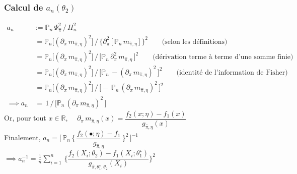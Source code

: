 \documentclass{article}
\begin{document}
            \subsubsection*{Calcul de $a_n(\theta_2)$}
                \begin{align*}
                    a_n & :=   \mathbb{P}_n\,\Psi_{\hat\pi}^2 \,\big/\, H_n^2 \\
                        & \,=  \mathbb{P}_n\Big[ (\partial_\pi\,{}m_{\hat\pi,\eta})^2 \Big] \,\big/\, \big\{ \partial^2_\pi\,\big[\,\mathbb{P}_n\,{}m_{\hat\pi,\eta}\,\big]\, \big\}^2 \qquad \mbox{(selon les définitions)} \\
                        & \,=  \mathbb{P}_n\Big[ (\partial_\pi\,{}m_{\hat\pi,\eta})^2 \Big] \,\big/\, \Big[ \mathbb{P}_n\, \partial^2_\pi\,{}m_{\hat\pi,\eta}\, \Big]^2 \qquad \mbox{(dérivation terme à terme d'une somme finie)} \\
                        & \,=  \mathbb{P}_n\Big[ (\partial_\pi\,{}m_{\hat\pi,\eta})^2 \Big] \,\big/\, \Big[ \mathbb{P}_n\, -(\partial_\pi\,{}m_{\hat\pi,\eta})^2\, \Big]^2 \qquad \mbox{(identité de l'information de Fisher)}\\
                        & \,=  \mathbb{P}_n\Big[ (\partial_\pi\,{}m_{\hat\pi,\eta})^2 \Big] \,\big/\, \Big[ -\,\mathbb{P}_n\, (\partial_\pi\,{}m_{\hat\pi,\eta})^2\, \Big]^2 \\
                \implies    a_n & \,= \,1 \,\big/\, \Big[ \mathbb{P}_n\, (\partial_\pi\,{}m_{\hat\pi,\eta})^2\, \Big]
                \end{align*}
                Or, pour tout $x\in\mathbb{R}$, $\quad \partial_\pi\,{}m_{\hat\pi,\eta}(x) = \dfrac{f_2(x;\eta)-f_1(x)}{g_{\hat\pi,\eta}(x)} $ \\

                Finalement, 
                    $ a_n = \Big[\, \mathbb{P}_n\,\Big\{\,\dfrac{f_2(\bullet;\eta)-f_1}{g_{\hat\pi,\eta}} \,\Big\}^2 \,\Big]^{-1} $ \\

                    $\implies a_n^{-1} = \frac{1}{n}\sum_{i=1}^n\, \Big\{ \dfrac{f_2(X_i;\theta_2) - f_1(X_i;\theta_1^\star)}{g_{\hat\pi,\theta_1^\star,\theta_2}(X_i)} \Big\}^2$
\end{document}
